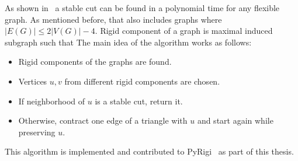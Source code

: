 As shown in~\cite[Algorithm 1]{stable_cuts_legersky} a stable cut can be found
in a polynomial time for any flexible graph.
As mentioned before, that also includes graphs where \( |E(G)| \le 2|V(G)| - 4 \).
Rigid component of a graph is maximal induced subgraph such that
The main idea of the algorithm works as follows:
%
\begin{itemize}
	\item Rigid components of the graphs are found.
	\item Vertices \( u, v \) from different rigid components are chosen.
	\item If neighborhood of \( u \) is a stable cut, return it.
	\item Otherwise, contract one edge of a triangle with \( u \) and start again while preserving \( u \).
\end{itemize}
%
This algorithm is implemented and
contributed to PyRigi~\cite{pyrigi} as part of this thesis.

